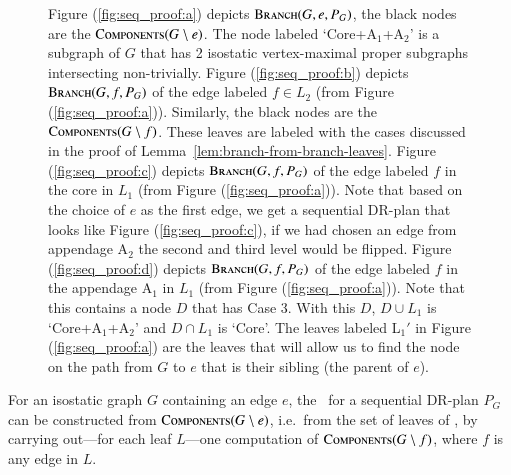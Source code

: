 \begin{figure}
    \caption{
    Figure (\ref{fig:seq_proof:a}) depicts $\textsc{Branch}(G,e,P_G)$, the black nodes are the $\textsc{Components}(G\setminus e)$. The node labeled `Core+A$_1$+A$_2$' is a subgraph of $G$ that has 2 isostatic vertex-maximal proper subgraphs intersecting non-trivially.
    Figure (\ref{fig:seq_proof:b}) depicts $\textsc{Branch}(G,f,P_G)$ of the edge labeled $f\in L_2$ (from Figure (\ref{fig:seq_proof:a})). Similarly, the black nodes are the $\textsc{Components}(G\setminus f)$. These leaves are labeled with the cases discussed in the proof of Lemma~\ref{lem:branch-from-branch-leaves}.
    Figure (\ref{fig:seq_proof:c}) depicts $\textsc{Branch}(G,f,P_G)$ of the edge labeled $f$ in the core in $L_1$ (from Figure (\ref{fig:seq_proof:a})). Note that based on the choice of $e$ as the first edge, we get a sequential DR-plan that looks like Figure (\ref{fig:seq_proof:c}), if we had chosen an edge from appendage A$_2$ the second and third level would be flipped.
    Figure (\ref{fig:seq_proof:d}) depicts $\textsc{Branch}(G,f,P_G)$ of the edge labeled $f$ in the appendage A$_1$ in $L_1$ (from Figure (\ref{fig:seq_proof:a})). Note that this contains a node $D$ that has Case 3. With this $D$, $D\cup L_1$ is `Core+A$_1$+A$_2$' and $D\cap L_1$ is `Core'. The leaves labeled L$_1'$ in Figure (\ref{fig:seq_proof:a}) are the leaves that will allow us to find the node on the path from $G$ to $e$ that is their sibling (the parent of $e$).
    }
    \label{fig:seq_proof}
\end{figure}


\begin{lemma}
\label{lem:branch-from-branch-leaves}
    For an isostatic graph $G$ containing an edge $e$, the \branchGePG\ for a sequential DR-plan $P_G$ can be constructed from $\textsc{Components}(G\setminus e)$, i.e.\ from the set of leaves of \branchGePG, by carrying out---for each leaf $L$---one computation of $\textsc{Components}(G\setminus f)$, where $f$ is any edge in $L$.
\end{lemma}

